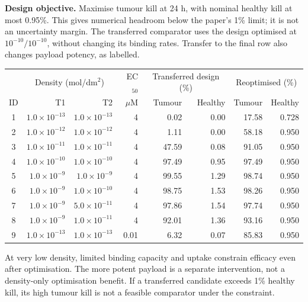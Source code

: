 \documentclass[10pt,a4paper]{article}
\begin{document}
\textbf{Design objective.} Maximise tumour kill at 24 h, with nominal healthy kill at most 0.95\%. This gives numerical headroom below the paper's 1\% limit; it is not an uncertainty margin. The transferred comparator uses the design optimised at $10^{-10}/10^{-10}$, without changing its binding rates. Transfer to the final row also changes payload potency, as labelled.
\begin{center}\small
\begin{tabular}{crrrrrrr}\toprule
 & \multicolumn{2}{c}{Density (mol/dm$^2$)} & EC$_{50}$ & \multicolumn{2}{c}{Transferred design (\%)} & \multicolumn{2}{c}{Reoptimised (\%)}\\
ID & T1 & T2 & $\mu$M & Tumour & Healthy & Tumour & Healthy\\\midrule
1 & $1.0\times10^{-13}$ & $1.0\times10^{-13}$ & 4 & 0.02 & 0.00 & 17.58 & 0.728 \\
2 & $1.0\times10^{-12}$ & $1.0\times10^{-12}$ & 4 & 1.11 & 0.00 & 58.18 & 0.950 \\
3 & $1.0\times10^{-11}$ & $1.0\times10^{-11}$ & 4 & 47.59 & 0.08 & 91.05 & 0.950 \\
4 & $1.0\times10^{-10}$ & $1.0\times10^{-10}$ & 4 & 97.49 & 0.95 & 97.49 & 0.950 \\
5 & $1.0\times10^{-9}$ & $1.0\times10^{-9}$ & 4 & 99.55 & 1.29 & 98.74 & 0.950 \\
6 & $1.0\times10^{-9}$ & $1.0\times10^{-10}$ & 4 & 98.75 & 1.53 & 98.26 & 0.950 \\
7 & $1.0\times10^{-9}$ & $5.0\times10^{-11}$ & 4 & 97.86 & 1.54 & 97.74 & 0.950 \\
8 & $1.0\times10^{-9}$ & $1.0\times10^{-11}$ & 4 & 92.01 & 1.36 & 93.16 & 0.950 \\
9 & $1.0\times10^{-13}$ & $1.0\times10^{-13}$ & 0.01 & 6.32 & 0.07 & 85.83 & 0.950 \\
\bottomrule\end{tabular}\end{center}
At very low density, limited binding capacity and uptake constrain efficacy even after optimisation. The more potent payload is a separate intervention, not a density-only optimisation benefit. If a transferred candidate exceeds 1\% healthy kill, its high tumour kill is not a feasible comparator under the constraint.
\end{document}
